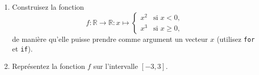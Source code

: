 \begin{exercice}\label{exoMatlab0036}

\begin{enumerate}
\item Construisez la fonction
\[ f:\mathbb{R} \rightarrow\mathbb{R} : x \mapsto
\begin{cases}
x^2 & \text{si } x<0, \\
x^3 & \text{si } x\ge 0 ,
\end{cases} \]
de manière qu'elle puisse prendre comme argument un vecteur $x$ (utilisez \verb+for+ et \verb+if+).
\item Représentez la fonction $f$ sur l'intervalle $[-3,3]$.
\end{enumerate}

\end{exercice}
